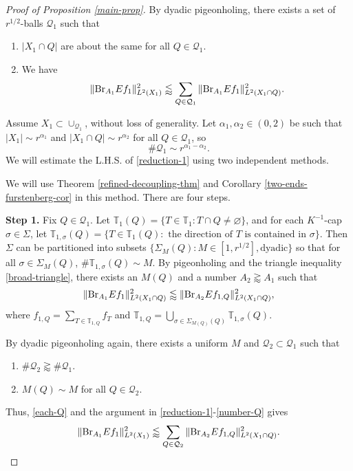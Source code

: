 \documentclass{amsart}
\numberwithin{equation}{section}
\newcommand{\al}{\alpha}
\newcommand{\si}{\sigma}
\newcommand{\Si}{\Sigma}
\newcommand{\cq}{\mathcal Q}
\newcommand{\ZT}{\mathbb{T}}
\newcommand{\BR}{{\rm{Br}}}
\begin{document}
\begin{proof}[Proof of Proposition \ref{main-prop}]
\smallskip

By dyadic pigeonholing, there exists a set of $r^{1/2}$-balls $\cq_1$ such that 
\begin{enumerate}
    \item $|X_1\cap Q|$ are about the same for all $Q\in\cq_1$.
    \item We have
    \begin{equation}
    \label{reduction-1}
        \|\BR_{A_1} Ef_1\|_{L^2(X_1)}^2\lessapprox\sum_{Q\in\cq_1}\|\BR_{A_1} Ef_1\|_{L^2(X_1\cap Q)}^2.
    \end{equation}
\end{enumerate}
Assume $X_1\subset \cup_{\cq_1}$, without loss of generality.
Let $\al_1,\al_2\in(0,2)$ be such that $|X_1|\sim r^{\al_1}$ and $|X_1\cap Q|\sim r^{\al_2}$ for all $Q\in\cq_1$, so 
\begin{equation}
\label{number-Q}
    \#\cq_1\sim r^{\al_1-\al_2}.
\end{equation}
We will estimate the L.H.S. of \eqref{reduction-1} using two independent methods.

\bigskip



We will use Theorem \ref{refined-decoupling-thm} and Corollary \ref{two-ends-furstenberg-cor} in this method.
There are four steps.

\medskip

{\bf Step 1. } 
Fix $Q\in\cq_1$.
Let $\ZT_1(Q)=\{T\in\ZT_1:T\cap Q\not=\varnothing\}$, and for each $K^{-1}$-cap $\si\in\Si$, let $\ZT_{1,\si}(Q)=\{T\in\ZT_1(Q):\text{ the direction of $T$ is contained in $\si$}\}$.
Then $\Si$ can be partitioned into subsets $\{\Si_M(Q): M\in[1,r^{1/2}], \text{dyadic}\}$ so that for all $\si\in\Si_M(Q)$, $\#\ZT_{1,\si}(Q)\sim M$.
By pigeonholing and the triangle inequality \eqref{broad-triangle}, there exists an $M(Q)$ and a number $A_2\gtrapprox A_1$ such that 
\begin{equation}
\label{each-Q}
    \|\BR_{A_1} Ef_1\|_{L^2(X_1\cap Q)}^2\lessapprox\|\BR_{A_2} Ef_{1,Q}\|_{L^2(X_1\cap Q)}^2,
\end{equation}
where $f_{1,Q}=\sum_{T\in\ZT_{1,Q}}f_T$ and $\ZT_{1,Q}=\bigcup_{\si\in\Si_{M(Q)}(Q)}\ZT_{1,\si}(Q)$.

By dyadic pigeonholing again, there exists a uniform $M$ and $\cq_2\subset\cq_1$ such that
\begin{enumerate}
    \item $\#\cq_2\gtrapprox\#\cq_1$.
    \item $M(Q)\sim M$ for all $Q\in\cq_2$.
\end{enumerate}
Thus, \eqref{each-Q} and the argument in \eqref{reduction-1}-\eqref{number-Q} gives
\begin{equation}
\label{sum-Q}
     \|\BR_{A_1} Ef_1\|_{L^2(X_1)}^2\lessapprox\sum_{Q\in\cq_2}\|\BR_{A_2} Ef_{1,Q}\|_{L^2(X_1\cap Q)}^2.
\end{equation}



\end{proof}
\end{document}

